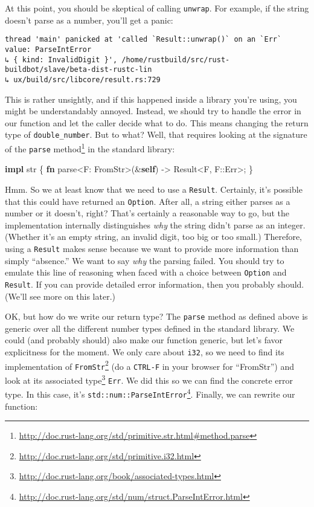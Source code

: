 \documentclass[a4paper,]{book}
\newenvironment{Shaded}{\begin{snugshade}}{\end{snugshade}}
\newcommand{\KeywordTok}[1]{\textcolor[rgb]{0.13,0.29,0.53}{\textbf{{#1}}}}
\newcommand{\DataTypeTok}[1]{\textcolor[rgb]{0.13,0.29,0.53}{{#1}}}
\newcommand{\ConstantTok}[1]{\textcolor[rgb]{0.00,0.00,0.00}{{#1}}}
\newcommand{\NormalTok}[1]{{#1}}
\renewcommand{\href}[2]{#2\footnote{\url{#1}}}
\begin{document}
At this point, you should be skeptical of calling \texttt{unwrap}. For
example, if the string doesn't parse as a number, you'll get a panic:

\begin{verbatim}
thread 'main' panicked at 'called `Result::unwrap()` on an `Err` value: ParseIntError 
↳ { kind: InvalidDigit }', /home/rustbuild/src/rust-buildbot/slave/beta-dist-rustc-lin
↳ ux/build/src/libcore/result.rs:729
\end{verbatim}

This is rather unsightly, and if this happened inside a library you're
using, you might be understandably annoyed. Instead, we should try to
handle the error in our function and let the caller decide what to do.
This means changing the return type of \texttt{double\_number}. But to
what? Well, that requires looking at the signature of the
\href{http://doc.rust-lang.org/std/primitive.str.html\#method.parse}{\texttt{parse}
method} in the standard library:

\begin{Shaded}
\begin{Highlighting}[]
\KeywordTok{impl} \DataTypeTok{str} \NormalTok{\{}
    \KeywordTok{fn} \NormalTok{parse<F: FromStr>(&}\KeywordTok{self}\NormalTok{) -> }\DataTypeTok{Result}\NormalTok{<F, F::}\ConstantTok{Err}\NormalTok{>;}
\NormalTok{\}}
\end{Highlighting}
\end{Shaded}

Hmm. So we at least know that we need to use a \texttt{Result}.
Certainly, it's possible that this could have returned an
\texttt{Option}. After all, a string either parses as a number or it
doesn't, right? That's certainly a reasonable way to go, but the
implementation internally distinguishes \emph{why} the string didn't
parse as an integer. (Whether it's an empty string, an invalid digit,
too big or too small.) Therefore, using a \texttt{Result} makes sense
because we want to provide more information than simply ``absence.'' We
want to say \emph{why} the parsing failed. You should try to emulate
this line of reasoning when faced with a choice between \texttt{Option}
and \texttt{Result}. If you can provide detailed error information, then
you probably should. (We'll see more on this later.)

OK, but how do we write our return type? The \texttt{parse} method as
defined above is generic over all the different number types defined in
the standard library. We could (and probably should) also make our
function generic, but let's favor explicitness for the moment. We only
care about \texttt{i32}, so we need to
\href{http://doc.rust-lang.org/std/primitive.i32.html}{find its
implementation of \texttt{FromStr}} (do a \texttt{CTRL-F} in your
browser for ``FromStr'') and look at its
\href{http://doc.rust-lang.org/book/associated-types.html}{associated
type} \texttt{Err}. We did this so we can find the concrete error type.
In this case, it's
\href{http://doc.rust-lang.org/std/num/struct.ParseIntError.html}{\texttt{std::num::ParseIntError}}.
Finally, we can rewrite our function:
\end{document}
